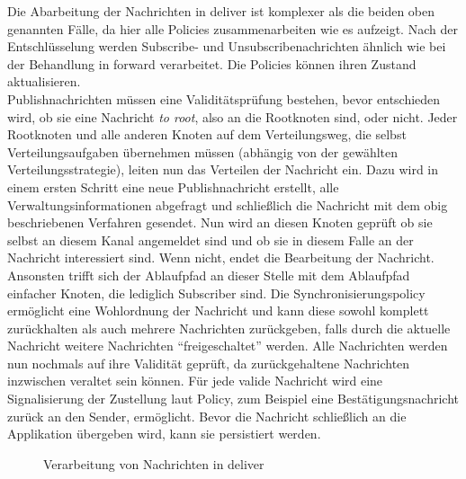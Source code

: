 Die Abarbeitung der Nachrichten in deliver ist komplexer als die beiden oben genannten Fälle, da hier alle Policies zusammenarbeiten wie es  aufzeigt. Nach der Entschlüsselung werden Subscribe- und Unsubscribenachrichten ähnlich wie bei der Behandlung in forward verarbeitet. Die Policies können ihren Zustand aktualisieren.\\
Publishnachrichten müssen eine Validitätsprüfung bestehen, bevor entschieden wird, ob sie eine Nachricht \emph{to root}, also an die Rootknoten sind, oder nicht. Jeder Rootknoten und alle anderen Knoten auf dem Verteilungsweg, die selbst Verteilungsaufgaben übernehmen müssen (abhängig von der gewählten Verteilungsstrategie), leiten nun das Verteilen der Nachricht ein. Dazu wird in einem ersten Schritt eine neue Publishnachricht erstellt, alle Verwaltungsinformationen abgefragt und schließlich die Nachricht mit dem obig beschriebenen Verfahren gesendet. Nun wird an diesen Knoten geprüft ob sie selbst an diesem Kanal angemeldet sind und ob sie in diesem Falle an der Nachricht interessiert sind. Wenn nicht, endet die Bearbeitung der Nachricht. Ansonsten trifft sich der Ablaufpfad an dieser Stelle mit dem Ablaufpfad einfacher Knoten, die lediglich Subscriber sind. Die Synchronisierungspolicy ermöglicht eine Wohlordnung der Nachricht und kann diese sowohl komplett zurückhalten als auch mehrere Nachrichten zurückgeben, falls durch die aktuelle Nachricht weitere Nachrichten ``freigeschaltet'' werden. Alle Nachrichten werden nun nochmals auf ihre Validität geprüft, da zurückgehaltene Nachrichten inzwischen veraltet sein können. Für jede valide Nachricht wird eine Signalisierung der Zustellung laut Policy, zum Beispiel eine Bestätigungsnachricht zurück an den Sender, ermöglicht. Bevor die Nachricht schließlich an die Applikation übergeben wird, kann sie persistiert werden.

\begin{figure}[htbp]
\centering
{}
\caption{Verarbeitung von Nachrichten in deliver}
\label{fig:processing_deliver}
\end{figure}

